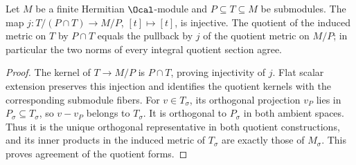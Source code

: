 \begin{lemma}
\label{lem:nested-quotient-metric}
\leanok
Let $M$ be a finite Hermitian $\Ocal$-module and $P\subseteq T\subseteq M$
be submodules. The map
$j:T/(P\cap T)\to M/P$, $[t]\mapsto[t]$, is injective.
The quotient of the induced metric on $T$ by $P\cap T$ equals the
pullback by $j$ of the quotient metric on $M/P$; in particular the
two norms of every integral quotient section agree.
\end{lemma}
\begin{proof}
The kernel of $T\to M/P$ is $P\cap T$, proving injectivity of $j$.
Flat scalar extension preserves this injection and identifies the
quotient kernels with the corresponding submodule fibers.
For $v\in T_\sigma$, its orthogonal projection $v_P$ lies in
$P_\sigma\subseteq T_\sigma$, so $v-v_P$ belongs to $T_\sigma$.
It is orthogonal to $P_\sigma$ in both ambient spaces. Thus it is the
unique orthogonal representative in both quotient constructions, and
its inner products in the induced metric of $T_\sigma$ are exactly
those of $M_\sigma$. This proves agreement of the quotient forms.
\end{proof}

